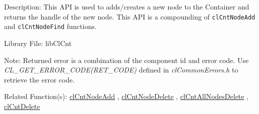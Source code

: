 \begin{Desc}
\item[Description:]
This API is used to adds/creates a new node to the Container and returns the handle of the new node. This API is a compounding of
{\tt{clCntNodeAdd}} and {\tt{clCntNodeFind}} functions.
\end{Desc}
\begin{Desc}
\item[Library File:]lib\-Cl\-Cnt\end{Desc}
\begin{Desc}
\item[Note:]Returned error is a combination of the component id and error code. Use \textit{CL\_\-GET\_\-ERROR\_\-CODE(RET\_\-CODE)} defined in \textit{clCommonErrors.h} to retrieve the error code.\end{Desc}
\begin{Desc}
\item[Related Function(s):]\hyperlink{pagecnt105}{cl\-Cnt\-Node\-Add} , \hyperlink{pagecnt108}{cl\-Cnt\-Node\-Delete} , 
\hyperlink{pagecnt106}{cl\-Cnt\-All\-Nodes\-Delete} , \hyperlink{pagecnt120}{cl\-Cnt\-Delete} \end{Desc}


\newpage
